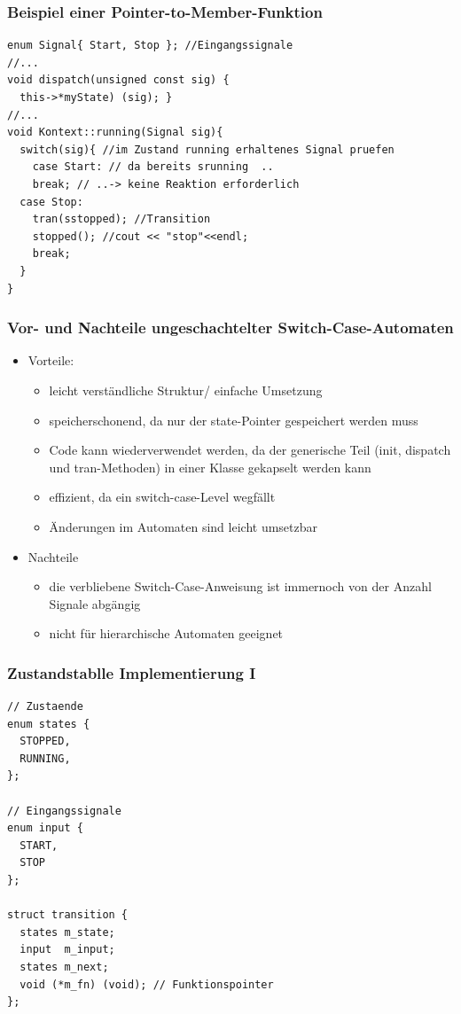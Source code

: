 \documentclass{beamer}
\begin{document}
\begin{frame}[fragile]
	\frametitle{Beispiel einer Pointer-to-Member-Funktion}
	\begin{lstlisting}
enum Signal{ Start, Stop }; //Eingangssignale
//...
void dispatch(unsigned const sig) {
  this->*myState) (sig); } 
//...
void Kontext::running(Signal sig){
  switch(sig){ //im Zustand running erhaltenes Signal pruefen
    case Start: // da bereits srunning  ..
    break; // ..-> keine Reaktion erforderlich
  case Stop:
    tran(sstopped); //Transition
    stopped(); //cout << "stop"<<endl;
    break;
  }
}  
	\end{lstlisting}
\end{frame}

\begin{frame}
	\frametitle{Vor- und Nachteile ungeschachtelter Switch-Case-Automaten}
	\begin{itemize}
		\item Vorteile:
		\begin{itemize}
			\item leicht verst\"andliche Struktur/ einfache Umsetzung
			\item speicherschonend, da nur der state-Pointer gespeichert werden muss
			\item Code kann wiederverwendet werden, da der generische Teil (init, dispatch und tran-Methoden) in einer Klasse gekapselt werden kann
			\item effizient, da ein switch-case-Level wegf\"allt
			\item \"Anderungen im Automaten sind leicht umsetzbar
		\end{itemize}
		\item Nachteile
		\begin{itemize}
			\item die verbliebene Switch-Case-Anweisung ist immernoch von der Anzahl Signale abg\"angig
			\item nicht f\"ur hierarchische Automaten geeignet
		\end{itemize}
	\end{itemize}
\end{frame}

\begin{frame}[fragile]
 \frametitle{Zustandstablle Implementierung I}
 \begin{lstlisting}
// Zustaende
enum states {
  STOPPED,
  RUNNING,
};

// Eingangssignale
enum input {
  START,
  STOP
};

struct transition {
  states m_state;
  input  m_input;
  states m_next;
  void (*m_fn) (void); // Funktionspointer
};
 \end{lstlisting}
\end{frame}
\end{document}

